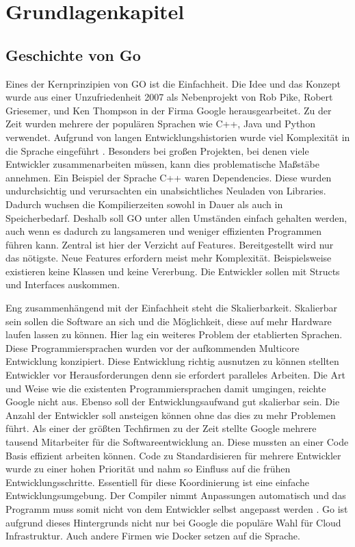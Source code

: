 \chapter{Grundlagenkapitel}\label{ch:data}

\section{Geschichte von Go}
Eines der Kernprinzipien von GO ist die Einfachheit. Die Idee und das Konzept wurde aus einer Unzufriedenheit 2007 als Nebenprojekt von Rob Pike, Robert Griesemer, und Ken Thompson in der Firma Google herausgearbeitet. Zu der Zeit wurden mehrere der populären Sprachen wie C++, Java und Python verwendet. Aufgrund von langen Entwicklungshistorien wurde viel Komplexität in die Sprache eingeführt \cite{donovan_go_2016}. Besonders bei großen Projekten, bei denen viele Entwickler zusammenarbeiten müssen, kann dies problematische Maßstäbe annehmen. Ein Beispiel der Sprache C++ waren Dependencies. Diese wurden undurchsichtig und verursachten ein unabsichtliches Neuladen von Libraries. Dadurch wuchsen die Kompilierzeiten sowohl in Dauer als auch in Speicherbedarf. Deshalb soll GO unter allen Umständen einfach gehalten werden, auch wenn es dadurch zu langsameren und weniger effizienten Programmen führen kann. Zentral ist hier der Verzicht auf Features. Bereitgestellt wird nur das nötigste. Neue Features erfordern meist mehr Komplexität. Beispielsweise existieren keine Klassen und keine Vererbung. Die Entwickler sollen mit Structs und Interfaces auskommen.\cite{cox_go_2022}

Eng zusammenhängend mit der Einfachheit steht die Skalierbarkeit. Skalierbar sein sollen die Software an sich und die Möglichkeit, diese auf mehr Hardware laufen lassen zu können. Hier lag ein weiteres Problem der etablierten Sprachen. Diese Programmiersprachen wurden vor der aufkommenden Multicore Entwicklung konzipiert. Diese Entwicklung richtig ausnutzen zu können stellten Entwickler vor Herausforderungen denn sie erfordert paralleles Arbeiten. Die Art und Weise wie die existenten Programmiersprachen damit umgingen, reichte Google nicht aus. Ebenso soll der Entwicklungsaufwand gut skalierbar sein. Die Anzahl der Entwickler soll ansteigen können ohne das dies zu mehr Problemen führt. Als einer der größten Techfirmen zu der Zeit stellte Google mehrere tausend Mitarbeiter für die Softwareentwicklung an. Diese mussten an einer Code Basis effizient arbeiten können. Code zu Standardisieren für mehrere Entwickler wurde zu einer hohen Priorität und nahm so Einfluss auf die frühen Entwicklungsschritte. Essentiell für diese Koordinierung ist eine einfache Entwicklungsumgebung. Der Compiler nimmt Anpassungen automatisch und das Programm muss somit nicht von dem Entwickler selbst angepasst werden . Go ist aufgrund dieses Hintergrunds nicht nur bei Google die populäre Wahl für Cloud Infrastruktur. Auch andere Firmen wie Docker setzen auf die Sprache.

